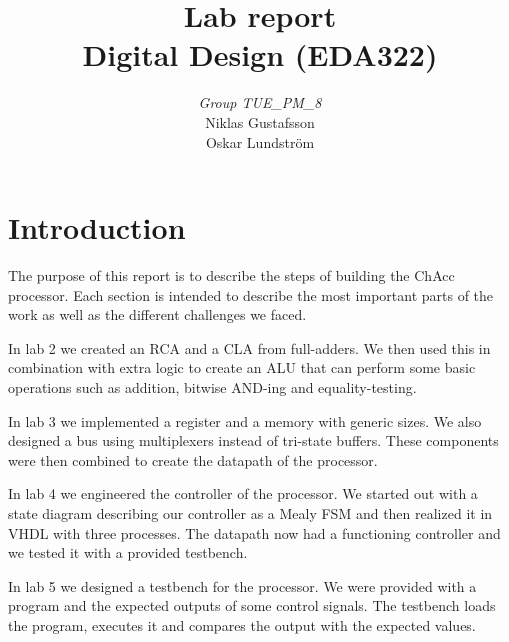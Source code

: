 \documentclass[a4paper,11pt]{article}
\begin{document}
\pagestyle{empty}
\begin{titlepage}

\title{\Huge{Lab report} \\[0.1cm] \Large{Digital Design (EDA322)} \\[0.4cm]}
\author{\large{\emph{Group TUE\_PM\_8}} \\[0.2cm] Niklas Gustafsson \\[0.05cm] Oskar Lundström \\[0.1cm]}
\maketitle
\thispagestyle{empty}
\end{titlepage}
\clearpage
\pagestyle{fancyplain}
\tableofcontents
\clearpage
\setcounter{page}{1}
\section{Introduction}

The purpose of this report is to describe the steps of building the ChAcc processor. Each section is intended to describe the most important parts of the work as well as the different challenges we faced.

In lab 2 we created an RCA and a CLA from full-adders. We then used this in combination with extra logic to create an ALU that can perform some basic operations such as addition, bitwise AND-ing and equality-testing.

In lab 3 we implemented a register and a memory with generic sizes. We also designed a bus using multiplexers instead of tri-state buffers. These components were then combined to create the datapath of the processor.

In lab 4 we engineered the controller of the processor. We started out with a state diagram describing our controller as a Mealy FSM and then realized it in VHDL with three processes. The datapath now had a functioning controller and we tested it with a provided testbench.

In lab 5 we designed a testbench for the processor. We were provided with a program and the expected outputs of some control signals. The testbench loads the program, executes it and compares the output with the expected values.
\end{document}
